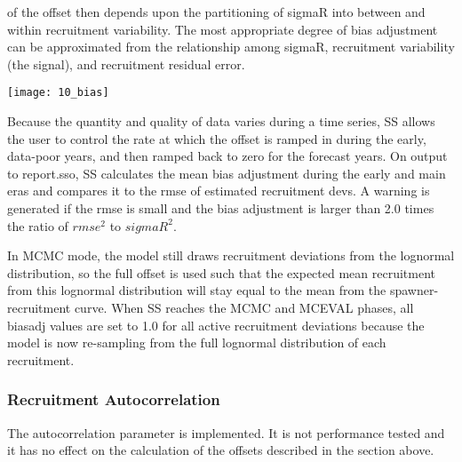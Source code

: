 \noindent of the offset then depends upon the partitioning of sigmaR into between and within recruitment variability.  The most appropriate degree of bias adjustment can be approximated from the relationship among sigmaR, recruitment variability (the signal), and recruitment residual error.

\begin{center}
	\texttt{[image: 10\_bias]}
\end{center}

Because the quantity and quality of data varies during a time series, SS allows the user to control the rate at which the offset is ramped in during the early, data-poor years, and then ramped back to zero for the forecast years.
On output to report.sso, SS calculates the mean bias adjustment during the early and main eras and compares it to the rmse of estimated recruitment devs.  A warning is generated if the rmse is small and the bias adjustment is larger than 2.0 times the ratio of $rmse^2$ to $sigmaR^2$.

In MCMC mode, the model still draws recruitment deviations from the lognormal distribution, so the full offset is used such that the expected mean recruitment from this lognormal distribution will stay equal to the mean from the spawner-recruitment curve. When SS reaches the MCMC and MCEVAL phases, all biasadj values are set to 1.0 for all active recruitment deviations because the model is now re-sampling from the full lognormal distribution of each recruitment.

\subsubsection{Recruitment Autocorrelation}
The autocorrelation parameter is implemented.  It is not performance tested and it has no effect on the calculation of the offsets described in the section above.

